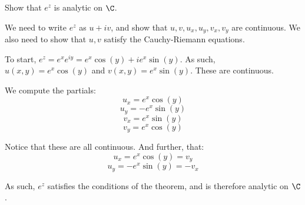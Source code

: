 \begin{ex}{}{} Show that $e^z$ is analytic on $\C$.

We need to write $e^z$ as $u + iv$, and show that $u,v, u_x, u_y, v_x, v_y$ are continuous. We also need to show that $u,v$ satisfy the Cauchy-Riemann equations.

To start, $e^z = e^{x}e^{iy} = e^x\cos(y) + ie^x\sin(y)$. As such, $u(x,y) = e^x\cos(y)$ and $v(x,y) = e^x\sin(y)$. These are continuous.

We compute the partials:
$$u_x = e^x\cos(y)$$
$$u_y = -e^x\sin(y)$$
$$v_x = e^x\sin(y)$$
$$v_y = e^x\cos(y)$$


Notice that these are all continuous. And further, that:
$$u_x = e^x\cos(y) = v_y$$
$$u_y = -e^x\sin(y) = -v_x$$

As such, $e^z$ satisfies the conditions of the theorem, and is therefore analytic on $\C$.
\end{ex}